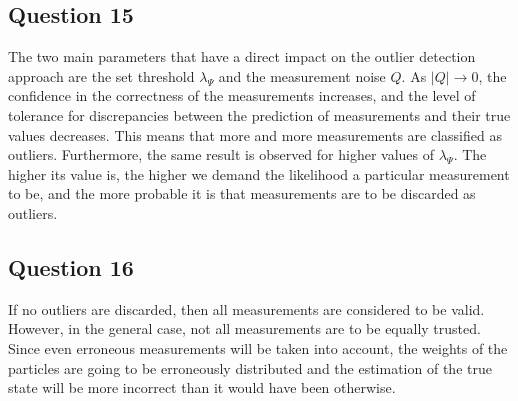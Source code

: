 \subsection{Question 15}

The two main parameters that have a direct impact on the outlier detection approach are the set threshold $\lambda_{\Psi}$ and the 
measurement noise $Q$. As $|Q| \rightarrow 0$, the confidence in the correctness of the measurements increases, and the level of tolerance for discrepancies
between the prediction of measurements and their true values decreases. This means that more and more measurements are classified as outliers. Furthermore, the same 
result is observed for higher values of $\lambda_{\Psi}$. The higher its value is, the higher we demand the likelihood a particular measurement to be, and the more
probable it is that measurements are to be discarded as outliers.

\subsection{Question 16}

If no outliers are discarded, then all measurements are considered to be valid. However, in the general case, not all measurements are to be equally trusted.
Since even erroneous measurements will be taken into account, the weights of the particles are going to be erroneously distributed and the estimation of the
true state will be more incorrect than it would have been otherwise.